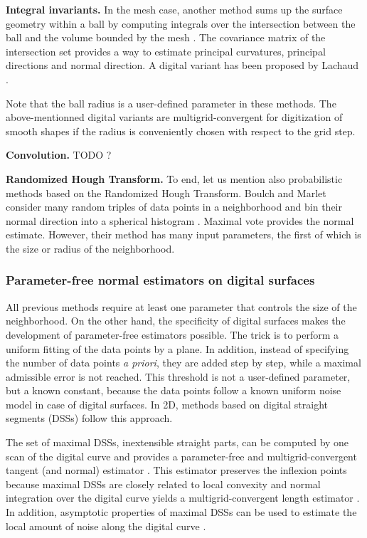 \noindent\textbf{Integral invariants.}
In the mesh case, another method sums up the surface geometry within a ball by 
computing integrals over the intersection between the ball and the volume
bounded by the mesh \cite{Pottmann2009}. The covariance matrix of the intersection set 
provides a way to estimate principal curvatures, principal directions and normal direction.
A digital variant has been proposed by Lachaud \etal \cite{Lachaud2017}.

Note that the ball radius is a user-defined parameter in these methods. The above-mentionned
digital variants \cite{Cuel2015,Lachaud2017} are multigrid-convergent for digitization
of smooth shapes if the radius is conveniently chosen with respect to the grid step.

\noindent\textbf{Convolution.}
TODO ?

\noindent\textbf{Randomized Hough Transform.}
To end, let us mention also probabilistic methods based on the Randomized Hough Transform.
Boulch and Marlet consider many random triples of data points in a neighborhood
and bin their normal direction into a spherical histogram \cite{Boulch2012}.
Maximal vote provides the normal estimate. However, their method has many input parameters,
the first of which is the size or radius of the neighborhood. 

\subsubsection{Parameter-free normal estimators on digital surfaces}

All previous methods require at least one parameter that controls the size of the neighborhood.
On the other hand, the specificity of digital surfaces makes the development of parameter-free
estimators possible. The trick is to perform a uniform fitting of the data points by a plane.
In addition, instead of specifying the number of data points \emph{a priori}, they are added
step by step, while a maximal admissible error is not reached. This threshold is not a user-defined
parameter, but a known constant, because the data points follow a known uniform noise model
in case of digital surfaces. In 2D, methods based on digital straight segments (DSSs) follow
this approach.

The set of maximal DSSs, \ie inextensible straight parts, can be computed by one scan of the
digital curve \cite{Feschet1999,Feschet2005} and provides a parameter-free and multigrid-convergent
tangent (and normal) estimator \cite{Lachaud2007}.
This estimator preserves the inflexion points because maximal DSSs are closely related to
local convexity \cite{Roussillon2011} and normal integration over the digital curve yields
a multigrid-convergent length estimator \cite{Coeurjolly2004}. 
In addition, asymptotic properties of maximal DSSs can be used to estimate the local amount
of noise along the digital curve \cite{Kerautret2012}.  

